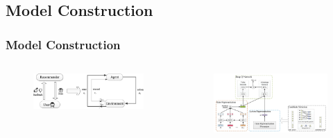 \documentclass{../presentation}
\begin{document}
    \subsection{Model Construction}
    \begin{frame}
        \frametitle{Model Construction}

        \begin{columns}
            \begin{column}{0.4\linewidth}
                \begin{figure}
                    \includegraphics[width=\linewidth]{img/gp01-5.jpg}
                \end{figure}
            \end{column}
            \begin{column}{0.55\linewidth}
                \begin{figure}
                    \includegraphics[width=\linewidth]{img/gp01-6.png}
                \end{figure}
            \end{column}
        \end{columns}


\end{frame}
\end{document}
